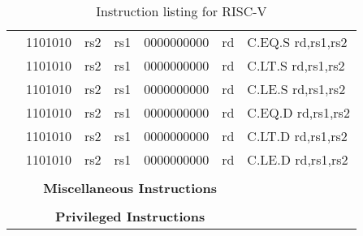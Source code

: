 \begin{table}[p]
\begin{small}
\begin{center}
\begin{tabular}{rcccccccccccl}
&
\multicolumn{2}{|c|}{1101010} &
\multicolumn{1}{c|}{rs2} &
\multicolumn{1}{c|}{rs1} &
\multicolumn{6}{c|}{0000000000} &
\multicolumn{1}{c|}{rd} & C.EQ.S rd,rs1,rs2 \\
\cline{2-12}
  

&
\multicolumn{2}{|c|}{1101010} &
\multicolumn{1}{c|}{rs2} &
\multicolumn{1}{c|}{rs1} &
\multicolumn{6}{c|}{0000000000} &
\multicolumn{1}{c|}{rd} & C.LT.S rd,rs1,rs2 \\
\cline{2-12}
  

&
\multicolumn{2}{|c|}{1101010} &
\multicolumn{1}{c|}{rs2} &
\multicolumn{1}{c|}{rs1} &
\multicolumn{6}{c|}{0000000000} &
\multicolumn{1}{c|}{rd} & C.LE.S rd,rs1,rs2 \\
\cline{2-12}
  

&
\multicolumn{2}{|c|}{1101010} &
\multicolumn{1}{c|}{rs2} &
\multicolumn{1}{c|}{rs1} &
\multicolumn{6}{c|}{0000000000} &
\multicolumn{1}{c|}{rd} & C.EQ.D rd,rs1,rs2 \\
\cline{2-12}
  

&
\multicolumn{2}{|c|}{1101010} &
\multicolumn{1}{c|}{rs2} &
\multicolumn{1}{c|}{rs1} &
\multicolumn{6}{c|}{0000000000} &
\multicolumn{1}{c|}{rd} & C.LT.D rd,rs1,rs2 \\
\cline{2-12}
  

&
\multicolumn{2}{|c|}{1101010} &
\multicolumn{1}{c|}{rs2} &
\multicolumn{1}{c|}{rs1} &
\multicolumn{6}{c|}{0000000000} &
\multicolumn{1}{c|}{rd} & C.LE.D rd,rs1,rs2 \\
\cline{2-12}
  

&
\multicolumn{11}{c}{} & \\
&
\multicolumn{11}{c}{\bf Miscellaneous Instructions} & \\
\cline{2-12}
  

&
\multicolumn{11}{c}{} & \\
&
\multicolumn{11}{c}{\bf Privileged Instructions} & \\
\cline{2-12}
  

\end{tabular}
\end{center}
\end{small}
\caption{Instruction listing for RISC-V}
\label{instr-table}
\end{table}
  
